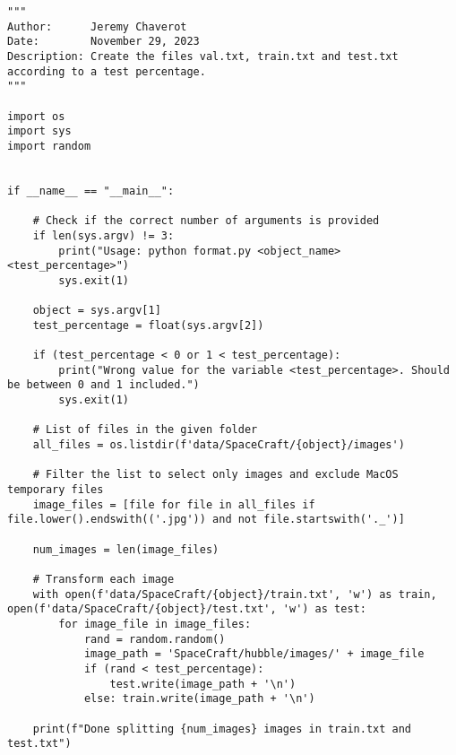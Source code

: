 \begin{lstlisting}[style=pythonstyle, label=lst:2, caption=Python script \texttt{format.py} to randomly generate the training set and the test set based on a specified probability. This script is used when creating both the reference set and the query set from a common set of images. Should be run from Gen6D's root folder.]
"""
Author:      Jeremy Chaverot
Date:        November 29, 2023
Description: Create the files val.txt, train.txt and test.txt according to a test percentage.
"""

import os
import sys
import random


if __name__ == "__main__":

	# Check if the correct number of arguments is provided
    if len(sys.argv) != 3:
        print("Usage: python format.py <object_name> <test_percentage>")
        sys.exit(1)

    object = sys.argv[1]
    test_percentage = float(sys.argv[2])

    if (test_percentage < 0 or 1 < test_percentage):
        print("Wrong value for the variable <test_percentage>. Should be between 0 and 1 included.")
        sys.exit(1)

    # List of files in the given folder
    all_files = os.listdir(f'data/SpaceCraft/{object}/images')

    # Filter the list to select only images and exclude MacOS temporary files
    image_files = [file for file in all_files if file.lower().endswith(('.jpg')) and not file.startswith('._')]

    num_images = len(image_files)

    # Transform each image
    with open(f'data/SpaceCraft/{object}/train.txt', 'w') as train, open(f'data/SpaceCraft/{object}/test.txt', 'w') as test:
        for image_file in image_files:
            rand = random.random()
            image_path = 'SpaceCraft/hubble/images/' + image_file
            if (rand < test_percentage):
                test.write(image_path + '\n')
            else: train.write(image_path + '\n')

    print(f"Done splitting {num_images} images in train.txt and test.txt")
\end{lstlisting}

\cleardoublepage{}



